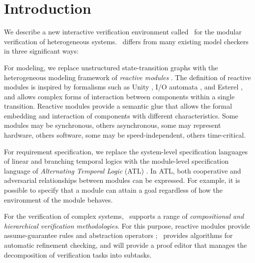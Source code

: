 \chapter{Introduction}
We describe a new interactive verification environment called \mocha\
for the modular verification of heterogeneous systems.
\mocha\ differs from many existing model checkers in three significant ways:

\begin{itemize}
\vitem 
  For modeling, we replace unstructured state-transition graphs with
  the heterogeneous modeling framework of {\it reactive modules}
  \cite{AlurHenzinger96}.  The definition of reactive modules is inspired by
  formalisms such as Unity \cite{ChandyMisra88}, 
  I/O automata \cite{Lynch96}, and Esterel
  \cite{BerryGonthier88}, and allows complex forms of interaction
  between components within a single transition.  Reactive modules provide a
  semantic glue that allows the formal embedding and interaction of
  components with different characteristics.  Some modules may be
  synchronous, others asynchronous, some may represent hardware,
  others software, some may be speed-independent, others
  time-critical.

\vitem
  For requirement specification, we replace the system-level specification 
  languages of linear and branching temporal logics \cite{Pnueli77,ClarkeEmerson81}
  with the module-level specification language of 
  {\it Alternating Temporal Logic} (ATL) \cite{AHK97}.
  In ATL, both cooperative and adversarial relationships between modules 
  can be expressed.
  For example, it is possible to specify that a module can attain a 
  goal regardless of how the environment of the module behaves.

\vitem 
   For the verification of complex systems, \mocha\ supports a range of
   {\em compositional and hierarchical verification methodologies}.
   For this purpose, reactive modules provide assume-guarantee rules 
   \cite{HQR98} and abstraction operators \cite{AHR98};
   \mocha\ provides algorithms for automatic refinement checking, and 
   will provide a proof editor that manages the decomposition of 
   verification tasks into subtasks.


\end{itemize}

